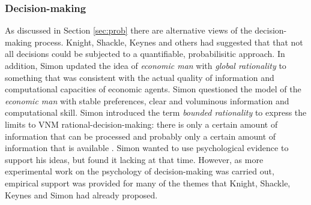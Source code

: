 \documentclass[12pt, a4paper, oneside]{article} %
\begin{document}
\subsubsection{Decision-making} 
As discussed in Section \ref{sec:prob} there are alternative views of the decision-making process.  Knight, Shackle, Keynes and others had suggested that that not all decisions could be subjected to a quantifiable, probabilisitic approach.  In addition, Simon updated the idea of \emph{economic man} with \emph{global rationality} to something that was consistent with the actual quality of information and computational capacities of economic agents.  Simon questioned the model of the \emph{economic man} with stable preferences, clear and voluminous information and computational skill.  Simon introduced the term \emph{bounded rationality} to express the limits to VNM rational-decision-making: there is only a certain amount of information that can be processed and probably only a certain amount of information that is available  \citep[p. 99]{Simon1955Behavioural}.    Simon wanted to use psychological evidence to support his ideas, but found it lacking at that time.  However, as more experimental work on the psychology of decision-making was carried out, empirical support was provided for many of the themes that Knight, Shackle, Keynes and Simon had already proposed.   



\end{document}
